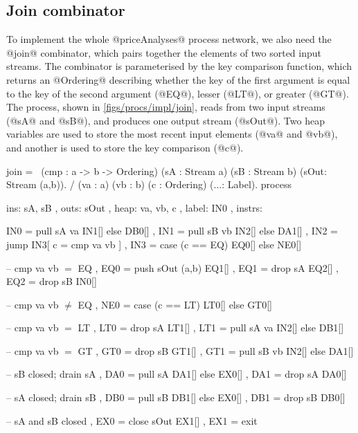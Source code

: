 \subsection{Join combinator}

To implement the whole @priceAnalyses@ process network, we also need the @join@ combinator, which pairs together the elements of two sorted input streams.
The combinator is parameterised by the key comparison function, which returns an @Ordering@ describing whether the key of the first argument is equal to the key of the second argument (@EQ@), lesser (@LT@), or greater (@GT@).
The process, shown in \cref{figs/procs/impl/join}, reads from two input streams (@sA@ and @sB@), and produces one output stream (@sOut@).
Two heap variables are used to store the most recent input elements (@va@ and @vb@), and another is used to store the key comparison (@c@).

\begin{process}[float,caption=Process implementation of \Hs/join/,label=figs/procs/impl/join]
join 
  = \ (cmp : a -> b -> Ordering)
      (sA  : Stream a) (sB : Stream b)
      (sOut: Stream (a,b)). 
    / (va : a) (vb : b) (c : Ordering) (...: Label).
    process
     { ins:    { sA, sB }
     , outs:   { sOut }
     , heap:   { va, vb, c }
     , label:  IN0
     , instrs: { IN0 = pull  sA va      IN1[] else DB0[]
               , IN1 = pull  sB vb      IN2[] else DA1[]
               , IN2 = jump             IN3[ c = cmp va vb ]
               , IN3 = case  (c == EQ)  EQ0[] else NE0[]

               -- cmp va vb $=$ EQ
               , EQ0 = push  sOut (a,b) EQ1[]
               , EQ1 = drop  sA         EQ2[]
               , EQ2 = drop  sB         IN0[]

               -- cmp va vb $\not=$ EQ
               , NE0 = case  (c == LT)  LT0[] else GT0[]

               -- cmp va vb $=$ LT
               , LT0 = drop  sA         LT1[]
               , LT1 = pull  sA va      IN2[] else DB1[]

               -- cmp va vb $=$ GT
               , GT0 = drop  sB         GT1[]
               , GT1 = pull  sB vb      IN2[] else DA1[]

               -- sB closed; drain sA
               , DA0 = pull  sA         DA1[] else EX0[]
               , DA1 = drop  sA         DA0[]

               -- sA closed; drain sB
               , DB0 = pull  sB         DB1[] else EX0[]
               , DB1 = drop  sB         DB0[]

               -- sA and sB closed
               , EX0 = close sOut       EX1[]
               , EX1 = exit } }
\end{process}

